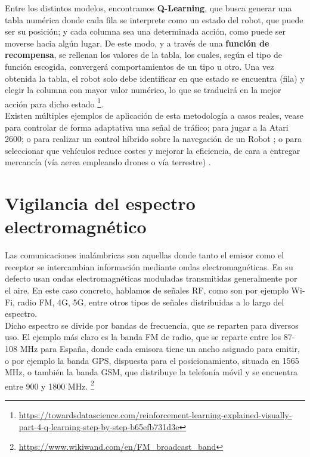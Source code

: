 Entre los distintos modelos, encontramos \textbf{Q-Learning}, que busca generar una tabla numérica donde cada fila se interprete como un estado del robot, que puede ser su posición; y cada columna sea una determinada acción, como puede ser moverse hacia algún lugar. De este modo, y a través de una \textbf{función de recompensa}, se rellenan los valores de la tabla, los cuales, según el tipo de función escogida, convergerá comportamientos de un tipo u otro. Una vez obtenida la tabla, el robot solo debe identificar en que estado se encuentra (fila) y elegir la columna con mayor valor numérico, lo que se traducirá en la mejor acción para dicho estado \footnote[20]{\url{https://towardsdatascience.com/reinforcement-learning-explained-visually-part-4-q-learning-step-by-step-b65efb731d3e}}.\\

Existen múltiples ejemplos de aplicación de esta metodología a casos reales, vease para controlar de forma adaptativa una señal de tráfico; para jugar a la Atari 2600; o para realizar un control híbrido sobre la navegación de un Robot \cite{q-learning-app}; o para seleccionar que vehículos reduce costes y mejorar la eficiencia, de cara a entregar mercancía (vía aerea empleando drones o vía terrestre) \cite{CHEN2022939}.

\section{Vigilancia del espectro electromagnético}
\label{subsec:señales}

Las comunicaciones inalámbricas son aquellas donde tanto el emisor como el receptor se intercambian información mediante ondas electromagnéticas. En su defecto usan ondas electromagnéticas moduladas transmitidas generalmente por el aire. En este caso concreto, hablamos de señales \ac{RF}, como son por ejemplo Wi-Fi, radio FM, 4G, 5G, entre otros tipos de señales distribuidas a lo largo del espectro.\\

Dicho espectro se divide por bandas de frecuencia, que se reparten para diversos uso. El ejemplo más claro es la banda FM de radio, que se reparte entre los 87-108 MHz para España, donde cada emisora tiene un ancho asignado para emitir, o por ejemplo la banda GPS, dispuesta para el posicionamiento, situada en 1565 MHz, o también la banda GSM, que distribuye la telefonía móvil y se encuentra entre 900 y 1800 MHz. \footnote[21]{\url{https://www.wikiwand.com/en/FM_broadcast_band}}\\

